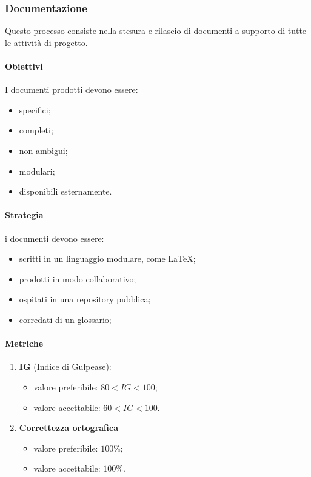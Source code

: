    \subsubsection{Documentazione}
        Questo processo consiste nella stesura e rilascio di documenti a supporto di tutte le attività di progetto.
        \paragraph{Obiettivi}
            I documenti prodotti devono essere:
            \begin{itemize}
                \item specifici;
                \item completi;
                \item non ambigui;
                \item modulari;
                \item disponibili esternamente.
            \end{itemize}
        \paragraph{Strategia} i documenti devono essere:
            \begin{itemize}
                \item scritti in un linguaggio modulare, come \LaTeX;
                \item prodotti in modo collaborativo;
                \item ospitati in una repository pubblica;
                \item corredati di un glossario;
            \end{itemize}
        \paragraph{Metriche}
        \begin{enumerate}
            \item \textbf{IG} (Indice di Gulpease):
            \begin{itemize}
                \item valore preferibile: $80< IG < 100$;
                \item valore accettabile: $60< IG < 100$.
            \end{itemize}
            \item \textbf{Correttezza ortografica}
            \begin{itemize}
                \item valore preferibile: $100\%$;
                \item valore accettabile: $100\%$.
            \end{itemize}
        \end{enumerate}
